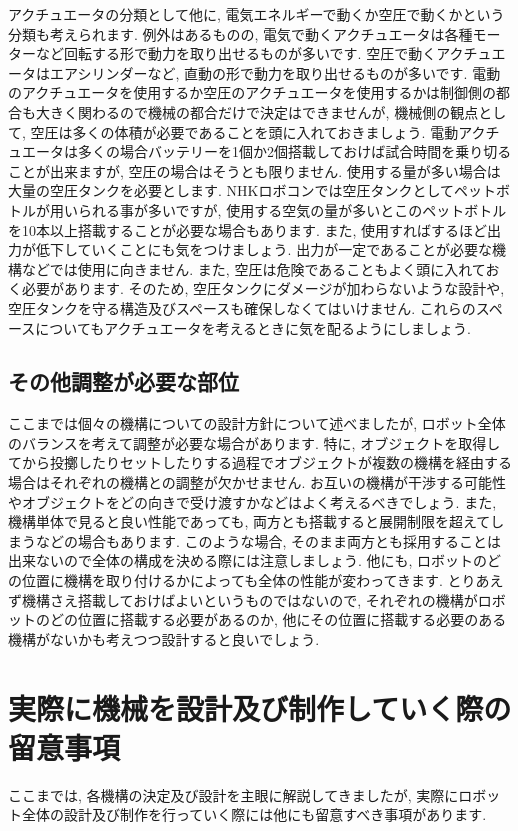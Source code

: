 アクチュエータの分類として他に, 電気エネルギーで動くか空圧で動くかという分類も考えられます. 例外はあるものの, 電気で動くアクチュエータは各種モーターなど回転する形で動力を取り出せるものが多いです. 空圧で動くアクチュエータはエアシリンダーなど, 直動の形で動力を取り出せるものが多いです. 
電動のアクチュエータを使用するか空圧のアクチュエータを使用するかは制御側の都合も大きく関わるので機械の都合だけで決定はできませんが, 機械側の観点として, 空圧は多くの体積が必要であることを頭に入れておきましょう. 電動アクチュエータは多くの場合バッテリーを1個か2個搭載しておけば試合時間を乗り切ることが出来ますが, 空圧の場合はそうとも限りません. 使用する量が多い場合は大量の空圧タンクを必要とします. NHKロボコンでは空圧タンクとしてペットボトルが用いられる事が多いですが, 使用する空気の量が多いとこのペットボトルを10本以上搭載することが必要な場合もあります. また, 使用すればするほど出力が低下していくことにも気をつけましょう. 出力が一定であることが必要な機構などでは使用に向きません. 
また, 空圧は危険であることもよく頭に入れておく必要があります. そのため, 空圧タンクにダメージが加わらないような設計や, 空圧タンクを守る構造及びスペースも確保しなくてはいけません. これらのスペースについてもアクチュエータを考えるときに気を配るようにしましょう. 
\subsection{その他調整が必要な部位}
ここまでは個々の機構についての設計方針について述べましたが, ロボット全体のバランスを考えて調整が必要な場合があります. 特に, オブジェクトを取得してから投擲したりセットしたりする過程でオブジェクトが複数の機構を経由する場合はそれぞれの機構との調整が欠かせません. お互いの機構が干渉する可能性やオブジェクトをどの向きで受け渡すかなどはよく考えるべきでしょう. また, 機構単体で見ると良い性能であっても, 両方とも搭載すると展開制限を超えてしまうなどの場合もあります. このような場合, そのまま両方とも採用することは出来ないので全体の構成を決める際には注意しましょう. 
他にも, ロボットのどの位置に機構を取り付けるかによっても全体の性能が変わってきます. とりあえず機構さえ搭載しておけばよいというものではないので, それぞれの機構がロボットのどの位置に搭載する必要があるのか, 他にその位置に搭載する必要のある機構がないかも考えつつ設計すると良いでしょう. 

\section{実際に機械を設計及び制作していく際の留意事項}
ここまでは, 各機構の決定及び設計を主眼に解説してきましたが, 実際にロボット全体の設計及び制作を行っていく際には他にも留意すべき事項があります. 
